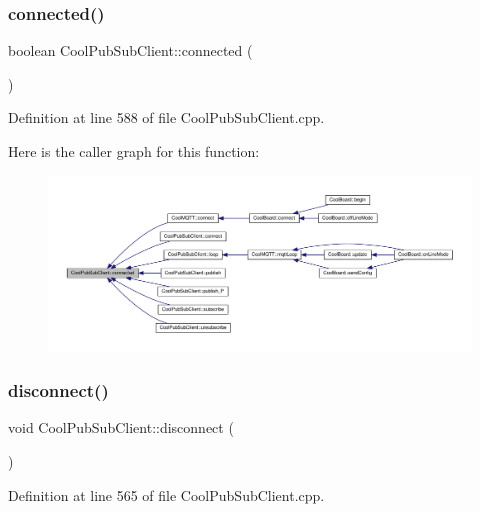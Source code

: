 \subsubsection{\texorpdfstring{connected()}{connected()}}
{\footnotesize\ttfamily boolean Cool\+Pub\+Sub\+Client\+::connected (\begin{DoxyParamCaption}{ }\end{DoxyParamCaption})}



Definition at line 588 of file Cool\+Pub\+Sub\+Client.\+cpp.

Here is the caller graph for this function\+:
\nopagebreak
\begin{figure}[H]
\begin{center}
\leavevmode
\includegraphics[width=350pt]{class_cool_pub_sub_client_a3d5a5da4ddb1e5c1bea64d80c665d148_icgraph}
\end{center}
\end{figure}
\mbox{\label{class_cool_pub_sub_client_a60bd133e45bebc921f6df20f45106490}} 
\subsubsection{\texorpdfstring{disconnect()}{disconnect()}}
{\footnotesize\ttfamily void Cool\+Pub\+Sub\+Client\+::disconnect (\begin{DoxyParamCaption}{ }\end{DoxyParamCaption})}



Definition at line 565 of file Cool\+Pub\+Sub\+Client.\+cpp.

\mbox{\label{class_cool_pub_sub_client_ac3c8bf1daed573d1ffa8b5c1fcb13f98}} 
